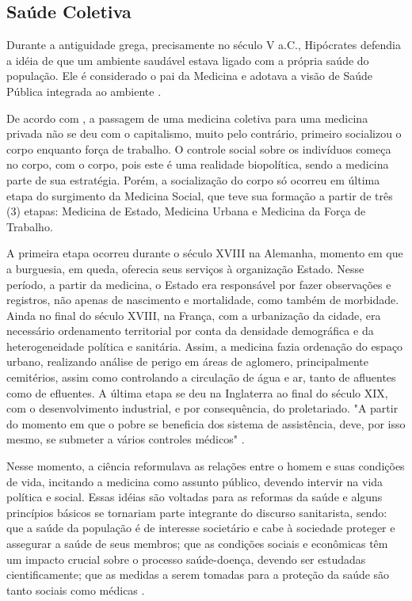 \subsection{Saúde Coletiva}

\indent Durante a antiguidade grega, precisamente no século V a.C., Hipócrates defendia a idéia de que um ambiente saudável estava ligado com a própria saúde do população. Ele é considerado o pai da Medicina e adotava a visão de Saúde Pública integrada ao ambiente \cite{CFMVSaude}.

\indent De acordo com , a passagem de uma medicina coletiva para uma medicina privada não se deu com o capitalismo, muito pelo contrário, primeiro socializou o corpo enquanto força de trabalho. O controle social sobre os indivíduos começa no corpo, com o corpo, pois este é uma realidade biopolítica, sendo a medicina parte de sua estratégia. Porém, a socialização do corpo só ocorreu em última etapa do surgimento da Medicina Social, que teve sua formação a partir de três (3) etapas: Medicina de Estado, Medicina Urbana e Medicina da Força de Trabalho.

\indent A primeira etapa ocorreu durante o século XVIII na Alemanha, momento em que a burguesia, em queda, oferecia seus serviços à organização Estado. Nesse período, a partir da medicina, o Estado era responsável por fazer observações e registros, não apenas de nascimento e mortalidade, como também de morbidade. Ainda no final do século XVIII, na França, com a urbanização da cidade, era necessário ordenamento territorial por conta da densidade demográfica e da heterogeneidade política e sanitária. Assim, a medicina fazia ordenação do espaço urbano, realizando análise de perigo em áreas de aglomero, principalmente cemitérios, assim como controlando a circulação de água e ar, tanto de afluentes como de efluentes. A última etapa se deu na Inglaterra ao final do século XIX, com o desenvolvimento industrial, e por consequência, do proletariado. "A partir do momento em que o pobre se beneficia dos sistema de assistência, deve, por isso mesmo, se submeter a vários controles médicos" \cite{Foucault1990Microfisica}.

\indent Nesse momento, a ciência reformulava as relações entre o homem e suas condições de vida, incitando a medicina como assunto público, devendo intervir na vida política e social.
Essas idéias são voltadas para as reformas da saúde e alguns princípios básicos se
tornariam parte integrante do discurso sanitarista, sendo: que a saúde da população é de interesse societário e cabe à sociedade proteger e assegurar a saúde de seus membros; que as condições sociais e econômicas têm um impacto crucial sobre o processo saúde-doença, devendo ser estudadas cientificamente; que as medidas a serem tomadas para a proteção da saúde são tanto sociais como médicas \cite{TratadoSaudeColetiva}.

